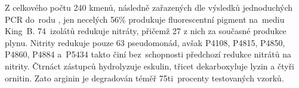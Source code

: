 Z celkového počtu 240 kmenů, následně zařazených dle výsledků jednoduchých PCR do~rodu , jen necelých 56\% produkuje fluorescentní pigment na~mediu King~B.
74~izolátů redukuje nitráty, přičemž 27 z nich za současné produkce plynu.
Nitrity redukuje pouze 63 pseudomonád, avšak P4108, P4815, P4850, P4860, P4884 a~P5434 takto činí bez~schopnosti předchozí redukce nitrátů na nitrity.
Čtrnáct zástupců hydrolyzuje eskulin, třicet dekarboxyluje lyzin a čtyři ornitin.
Zato arginin je degradován téměř 75ti~procenty testovaných vzorků.\\



\shorthandon{-} 


\cleardoublepage

